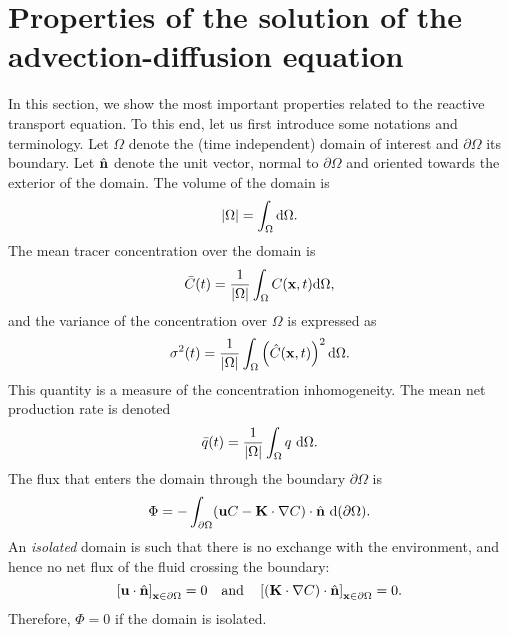 \section{Properties of the solution of the advection-diffusion equation}\label{sec:propcontinuous}
In this section, we show the most important properties related to the reactive transport equation. To this end, let us first introduce some notations and terminology. Let $\Omega$ denote the (time independent) domain of interest and $\partial \Omega$ its boundary. Let $\hat{\b n}$ denote the unit vector, normal to $\partial \Omega$ and oriented towards the exterior of the domain. The volume of the domain is
\begin{equation}
	|\Omega| = \int_{\Omega} \rm d\Omega.	
\end{equation}
The mean tracer concentration over the domain is
\begin{equation} \label{eq:Cmean}
	\bar{C}(t) = \frac{1}{|\Omega|}\int_{\Omega} C(\b x,t) \rm d\Omega,
\end{equation}
and the variance of the concentration over $\Omega$ is expressed as
\begin{equation} \label{eq:sigma2continuous}
 	\sigma^2(t) = \frac{1}{|\Omega|} \int_{\Omega} \left(\hat C(\b x,t)\right)^2 \rm d\Omega.
\end{equation}
This quantity is a measure of the concentration inhomogeneity.
The mean net production rate is denoted
\begin{equation}
	\bar q(t) = \frac{1}{|\Omega|}\int_\Omega q\ \rm d\Omega.
\end{equation}
The flux that enters the domain through the boundary $\partial \Omega$ is
\begin{equation}
	\Phi = -\int_{\partial \Omega} (\b uC - \b K \cdot \nabla C)\cdot \n\ \rm d(\partial \Omega).
\end{equation}
An \textit{isolated} domain is such that there is no exchange with the environment, and hence no net flux of the fluid crossing the boundary:
\begin{equation} \label{eq:isolateddomain}
	\left[ \b u \cdot \hat{\b n}\right]_{\b x \in \partial \Omega} = 0 \quad \mbox{and} \quad \left[ (\b K \cdot \nabla C) \cdot \hat{\b n}\right]_{\b x \in \partial \Omega} = 0.
\end{equation}
Therefore, $\Phi=0$ if the domain is isolated.

